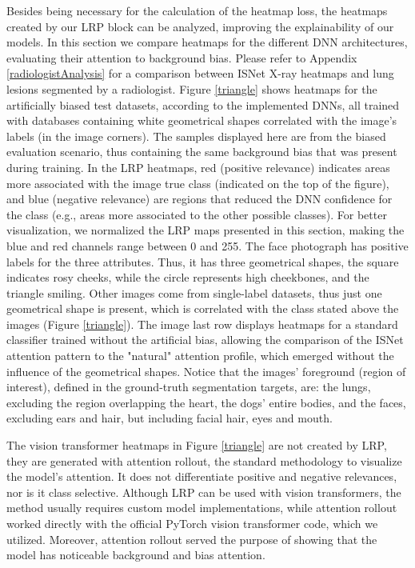 \documentclass[fleqn,10pt]{wlscirep}
\begin{document}
{Besides being necessary for the calculation of the heatmap loss, the heatmaps created by our LRP block can be analyzed, improving the explainability of our models. In this section we compare heatmaps for the different DNN architectures, evaluating their attention to background bias. Please refer to Appendix \ref{radiologistAnalysis} for a comparison between ISNet X-ray heatmaps and lung lesions segmented by a radiologist. Figure \ref{triangle} shows heatmaps for the artificially biased test datasets, according to the implemented DNNs, all trained with databases containing white geometrical shapes correlated with the image's labels (in the image corners). The samples displayed here are from the biased evaluation scenario, thus containing the same background bias that was present during training. In the LRP heatmaps, red (positive relevance) indicates areas more associated with the image true class (indicated on the top of the figure), and blue (negative relevance) are regions that reduced the DNN confidence for the class (e.g., areas more associated to the other possible classes). For better visualization, we normalized the LRP maps presented in this section, making the blue and red channels range between 0 and 255. The face photograph has positive labels for the three attributes. Thus, it has three geometrical shapes, the square indicates rosy cheeks, while the circle represents high cheekbones, and the triangle smiling. Other images come from single-label datasets, thus just one geometrical shape is present, which is correlated with the class stated above the images (Figure \ref{triangle}). The image last row displays heatmaps for a standard classifier trained without the artificial bias, allowing the comparison of the ISNet attention pattern to the "natural" attention profile, which emerged without the influence of the geometrical shapes. Notice that the images' foreground (region of interest), defined in the ground-truth segmentation targets, are: the lungs, excluding the region overlapping the heart, the dogs' entire bodies, and the faces, excluding ears and hair, but including facial hair, eyes and mouth.

The vision transformer heatmaps in Figure \ref{triangle} are not created by LRP, they are generated with attention rollout, the standard methodology to visualize the model's attention\cite{VisionTransformer}. It does not differentiate positive and negative relevances, nor is it class selective. Although LRP can be used with vision transformers, the method usually requires custom model implementations, while attention rollout worked directly with the official PyTorch vision transformer code, which we utilized. Moreover, attention rollout served the purpose of showing that the model has noticeable background and bias attention.

}
\end{document}
